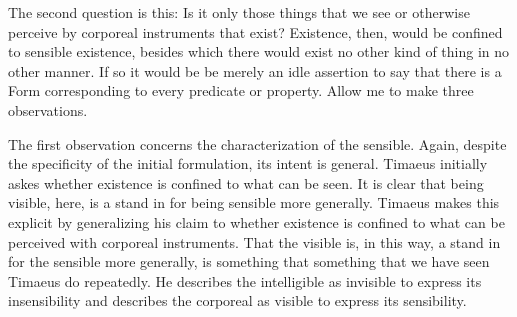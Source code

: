 
The second question is this: Is it only those things that we see or otherwise perceive by corporeal instruments that exist? Existence, then, would be confined to sensible existence, besides which there would exist no other kind of thing in no other manner. If so it would be be merely an idle assertion to say that there is a Form corresponding to every predicate or property. Allow me to make three observations.

The first observation concerns the characterization of the sensible. Again, despite the specificity of the initial formulation, its intent is general. Timaeus initially askes whether existence is confined to what can be seen. It is clear that being visible, here, is a stand in for being sensible more generally. Timaeus makes this explicit by generalizing his claim to whether existence is confined to what can be perceived with corporeal instruments. That the visible is, in this way, a stand in for the sensible more generally, is something that something that we have seen Timaeus do repeatedly. He describes the intelligible as invisible to express its insensibility and describes the corporeal as visible to express its sensibility. 

